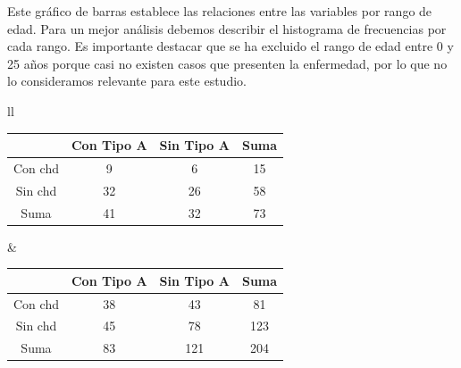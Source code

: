 \documentclass[a4paper, 9pt]{article}
\begin{document}
Este gráfico de barras establece las relaciones entre las variables por rango de edad. Para un mejor análisis debemos describir el histograma de frecuencias por cada rango. Es importante destacar que se ha excluido el rango de edad entre 0 y 25 años porque casi no existen casos que presenten la enfermedad, por lo que no lo consideramos relevante para este estudio.
    \begin{table}[!htb]
        \centering
        \begin{tabular}{ll}
        \begin{tabular}{c|c|c|c|}
        \cline{2-4}
                                                           & Con Tipo A     & Sin Tipo A     & Suma \\ \hline
        \multicolumn{1}{|c|}{Con chd}     & 9                          & 6                          & 15   \\ \hline
        \multicolumn{1}{|c|}{Sin chd}     & 32                         & 26                         & 58   \\ \hline
        \multicolumn{1}{|c|}{Suma}                         & 41                         & 32                         & 73   \\ \hline
        \end{tabular}
        &
        \begin{tabular}{c|c|c|c|}
            \cline{2-4}
                                                           & Con Tipo A    & Sin Tipo A      & Suma \\ \hline
        \multicolumn{1}{|c|}{Con chd}     & 38                         & 43                         & 81   \\ \hline
        \multicolumn{1}{|c|}{Sin chd}     & 45                         & 78                         & 123   \\ \hline
        \multicolumn{1}{|c|}{Suma}                         & 83                         & 121                        & 204   \\ \hline
        \end{tabular}
        \end{tabular}
    \end{table}
    
\end{document}
